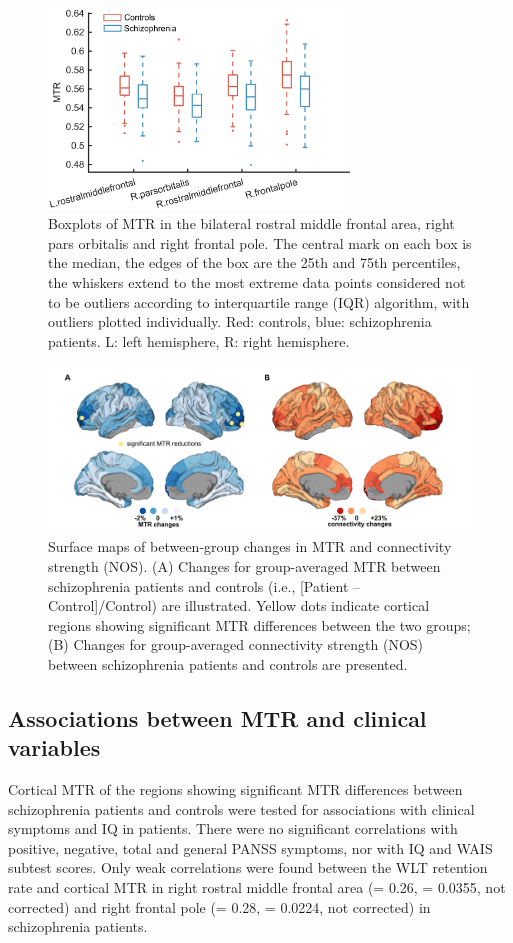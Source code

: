 \begin{refsection}
\begin{figure}[h]
    \centering
    \includegraphics[width=8cm]{images/mtrFig1.jpg}
    \caption{Boxplots of MTR in the bilateral rostral middle frontal area, right pars orbitalis and right frontal pole. The central mark on each box is the median, the edges of the box are the 25th and 75th percentiles, the whiskers extend to the most extreme data points considered not to be outliers according to interquartile range (IQR) algorithm, with outliers plotted individually. Red: controls, blue: schizophrenia patients. L: left hemisphere, R: right hemisphere.}
    \label{mtrFig1}
\end{figure}

\begin{figure}[H]
    \centering
    \includegraphics[width=\linewidth]{images/mtrFig2.jpg}
    \caption{Surface maps of between-group changes in MTR and connectivity strength (NOS). (A) Changes for group-averaged MTR between schizophrenia patients and controls (i.e., {[}Patient – Control{]}/Control) are illustrated. Yellow dots indicate cortical regions showing significant MTR differences between the two groups; (B) Changes for group-averaged connectivity strength (NOS) between schizophrenia patients and controls are presented.}
    \label{mtrFig2}
\end{figure}

\subsection*{Associations between MTR and clinical variables}
Cortical MTR of the regions showing significant MTR differences between schizophrenia patients and controls were tested for associations with clinical symptoms and IQ in patients. There were no significant correlations with positive, negative, total and general PANSS symptoms, nor with IQ and WAIS subtest scores. Only weak correlations were found between the WLT retention rate and cortical MTR in right rostral middle frontal area (\rval = 0.26, \pval = 0.0355, not corrected) and right frontal pole (\rval = 0.28, \pval = 0.0224, not corrected) in schizophrenia patients.


\end{refsection}
